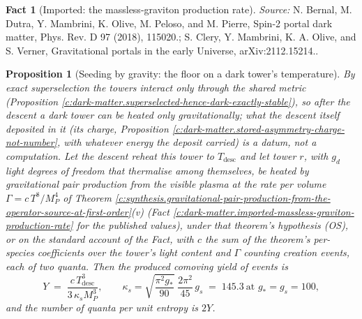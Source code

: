 \documentclass[11pt]{article}
\newtheorem{proposition}[theorem]{Proposition}
\theoremstyle{definition}
\newtheorem{fact}[theorem]{Fact}
\theoremstyle{plain}
\newcommand{\changedmark}[2]{\marginpar{\raggedright\scriptsize\color{#1}#2}}
\begin{document}
\begin{fact}[Imported: the massless-graviton production rate]
\emph{Source:} N. Bernal, M. Dutra, Y. Mambrini, K. Olive, M. Peloso, and M. Pierre, Spin-2 portal dark matter, Phys. Rev. D 97 (2018), 115020.; S. Clery, Y. Mambrini, K. A. Olive, and S. Verner, Gravitational portals in the early Universe, arXiv:2112.15214..
\end{fact}

\begin{proposition}[Seeding by gravity: the floor on a dark tower's temperature]\label{c:dark-matter.seeding-gravity-floor-dark-towers-temperature}
\changedmark{BurntOrange}{changed since the deposit}
By exact superselection the towers interact only through the shared metric (Proposition \ref{c:dark-matter.superselected-hence-dark-exactly-stable}), so after the descent a dark tower can be heated only gravitationally; what the descent itself deposited in it (its charge, Proposition \ref{c:dark-matter.stored-asymmetry-charge-not-number}, with whatever energy the deposit carried) is a datum, not a computation. Let the descent reheat this tower to $T_{\mathrm{desc}}$ and let tower $r$, with $g_{d}$ light degrees of freedom that thermalise among themselves, be heated by gravitational pair production from the visible plasma at the rate per volume $\Gamma = c\,T^{8}/M_{P}^{4}$ of Theorem \ref{c:synthesis.gravitational-pair-production-from-the-operator-source-at-first-order}(v) (Fact \ref{c:dark-matter.imported-massless-graviton-production-rate} for the published values), under that theorem's hypothesis (OS), or on the standard account of the Fact, with $c$ the sum of the theorem's per-species coefficients over the tower's light content and $\Gamma$ counting creation events, each of two quanta. Then the produced comoving yield of events is
\[
Y \;=\; \frac{c\,T_{\mathrm{desc}}^{3}}{3\,\kappa_{s}M_{P}^{3}}, \qquad \kappa_{s} = \sqrt{\frac{\pi^{2}g_{*}}{90}}\;\frac{2\pi^{2}}{45}\,g_{s} \;=\; 145.3 \ \text{at } g_{*} = g_{s} = 100,
\]
and the number of quanta per unit entropy is $2Y$.


\end{proposition}
\end{document}
